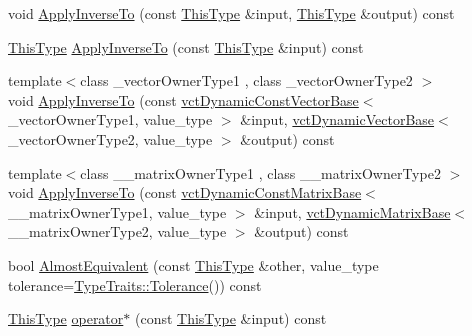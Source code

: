 \begin{DoxyCompactItemize}
\item 
void \hyperlink{classvct_quaternion_rotation3_base_afe92782ee4eb089405be71a71e52d9eb}{Apply\+Inverse\+To} (const \hyperlink{classvct_quaternion_base_af28efdc38acf89acb7a67afada11408c}{This\+Type} \&input, \hyperlink{classvct_quaternion_base_af28efdc38acf89acb7a67afada11408c}{This\+Type} \&output) const 
\item 
\hyperlink{classvct_quaternion_base_af28efdc38acf89acb7a67afada11408c}{This\+Type} \hyperlink{classvct_quaternion_rotation3_base_a71037e72bd6869d7773006c7bb77e04b}{Apply\+Inverse\+To} (const \hyperlink{classvct_quaternion_base_af28efdc38acf89acb7a67afada11408c}{This\+Type} \&input) const 
\item 
{\footnotesize template$<$class \+\_\+vector\+Owner\+Type1 , class \+\_\+vector\+Owner\+Type2 $>$ }\\void \hyperlink{classvct_quaternion_rotation3_base_a6febf7108436b0ae6935c8bb5557cfa7}{Apply\+Inverse\+To} (const \hyperlink{classvct_dynamic_const_vector_base}{vct\+Dynamic\+Const\+Vector\+Base}$<$ \+\_\+vector\+Owner\+Type1, value\+\_\+type $>$ \&input, \hyperlink{classvct_dynamic_vector_base}{vct\+Dynamic\+Vector\+Base}$<$ \+\_\+vector\+Owner\+Type2, value\+\_\+type $>$ \&output) const 
\item 
{\footnotesize template$<$class \+\_\+\+\_\+matrix\+Owner\+Type1 , class \+\_\+\+\_\+matrix\+Owner\+Type2 $>$ }\\void \hyperlink{classvct_quaternion_rotation3_base_a99017a2bf77db7f404eddfc6ac44e899}{Apply\+Inverse\+To} (const \hyperlink{classvct_dynamic_const_matrix_base}{vct\+Dynamic\+Const\+Matrix\+Base}$<$ \+\_\+\+\_\+matrix\+Owner\+Type1, value\+\_\+type $>$ \&input, \hyperlink{classvct_dynamic_matrix_base}{vct\+Dynamic\+Matrix\+Base}$<$ \+\_\+\+\_\+matrix\+Owner\+Type2, value\+\_\+type $>$ \&output) const 
\item 
bool \hyperlink{classvct_quaternion_rotation3_base_aa525dec7b10d16177b9e4b59685ba0b0}{Almost\+Equivalent} (const \hyperlink{classvct_quaternion_base_af28efdc38acf89acb7a67afada11408c}{This\+Type} \&other, value\+\_\+type tolerance=\hyperlink{classcmn_type_traits_adc129bf9867295b90d300768b780fa99}{Type\+Traits\+::\+Tolerance}()) const 
\item 
\hyperlink{classvct_quaternion_base_af28efdc38acf89acb7a67afada11408c}{This\+Type} \hyperlink{classvct_quaternion_rotation3_base_a227f3e3cdab401dd2270a70bdd925c0f}{operator$\ast$} (const \hyperlink{classvct_quaternion_base_af28efdc38acf89acb7a67afada11408c}{This\+Type} \&input) const 
\end{DoxyCompactItemize}
